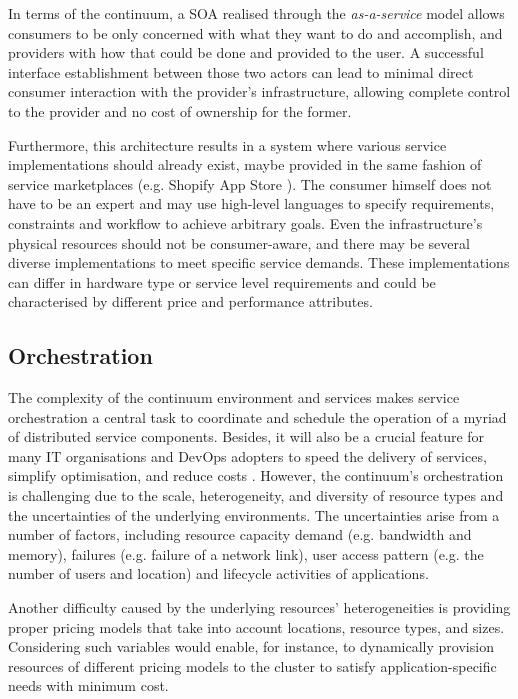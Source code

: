In terms of the continuum, a SOA realised through the \emph{as-a-service} model allows consumers to be only concerned with what they want to do and accomplish, and providers with how that could be done and provided to the user. A successful interface establishment between those two actors can lead to minimal direct consumer interaction with the provider's infrastructure, allowing complete control to the provider and no cost of ownership for the former.

Furthermore, this architecture results in a system where various service implementations should already exist, maybe provided in the same fashion of service marketplaces (e.g. Shopify App Store \cite{shopify}). The consumer himself does not have to be an expert and may use high-level languages to specify requirements, constraints and workflow to achieve arbitrary goals. Even the infrastructure's physical resources should not be consumer-aware, and there may be several diverse implementations to meet specific service demands. These implementations can differ in hardware type or service level requirements and could be characterised by different price and performance attributes.

\subsection{Orchestration}

The complexity of the continuum environment and services makes service orchestration a central task to coordinate and schedule the operation of a myriad of distributed service components. Besides, it will also be a crucial feature for many IT organisations and DevOps adopters to speed the delivery of services, simplify optimisation, and reduce costs \cite{akamai}. However, the continuum's orchestration is challenging due to the scale, heterogeneity, and diversity of resource types and the uncertainties of the underlying environments. The uncertainties arise from a number of factors, including resource capacity demand (e.g. bandwidth and memory), failures (e.g. failure of a network link), user access pattern (e.g. the number of users and location) and lifecycle activities of applications.

Another difficulty caused by the underlying resources' heterogeneities is providing proper pricing models that take into account locations, resource types, and sizes. Considering such variables would enable, for instance, to dynamically provision resources of different pricing models to the cluster to satisfy application-specific needs with minimum cost.

